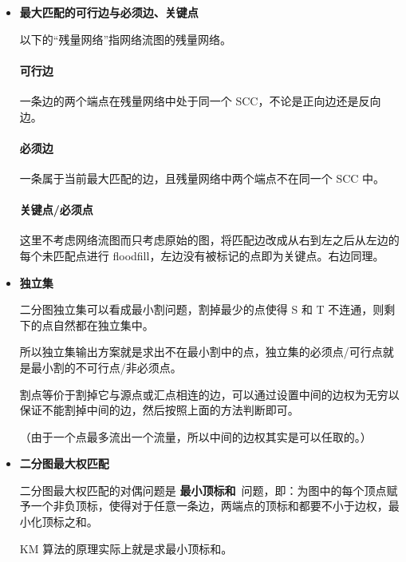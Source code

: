 \begin{itemize}

\item \textbf{最大匹配的可行边与必须边、关键点}

以下的“残量网络”指网络流图的残量网络。

\paragraph{可行边} 一条边的两个端点在残量网络中处于同一个 SCC，不论是正向边还是反向边。

\paragraph{必须边} 一条属于当前最大匹配的边，且残量网络中两个端点不在同一个 SCC 中。

\paragraph{关键点/必须点} 这里不考虑网络流图而只考虑原始的图，将匹配边改成从右到左之后从左边的每个未匹配点进行 floodfill，左边没有被标记的点即为关键点。右边同理。

\item \textbf{独立集}

二分图独立集可以看成最小割问题，割掉最少的点使得 S 和 T 不连通，则剩下的点自然都在独立集中。

所以独立集输出方案就是求出不在最小割中的点，独立集的必须点/可行点就是最小割的不可行点/非必须点。

割点等价于割掉它与源点或汇点相连的边，可以通过设置中间的边权为无穷以保证不能割掉中间的边，然后按照上面的方法判断即可。

（由于一个点最多流出一个流量，所以中间的边权其实是可以任取的。）

\item \textbf{二分图最大权匹配}

二分图最大权匹配的对偶问题是 \textbf{最小顶标和}\ 问题，即：为图中的每个顶点赋予一个非负顶标，使得对于任意一条边，两端点的顶标和都要不小于边权，最小化顶标之和。

KM 算法的原理实际上就是求最小顶标和。

\end{itemize}
